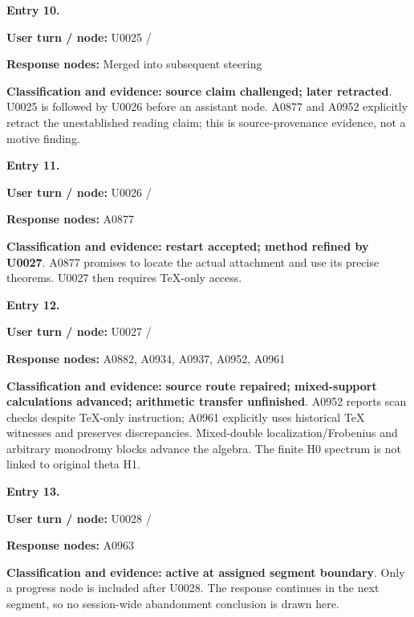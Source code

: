 
\textbf{Entry 10.}

\textbf{User turn / node:} U0025 /
\protect{}

\textbf{Response nodes:} Merged into subsequent steering

\textbf{Classification and evidence:} \textbf{source claim challenged;
later retracted}. U0025 is followed by U0026 before an assistant node.
A0877 and A0952 explicitly retract the unestablished reading claim; this
is source-provenance evidence, not a motive finding.


\textbf{Entry 11.}

\textbf{User turn / node:} U0026 /
\protect{}

\textbf{Response nodes:} A0877

\textbf{Classification and evidence:} \textbf{restart accepted; method
refined by U0027}. A0877 promises to locate the actual attachment and
use its precise theorems. U0027 then requires TeX-only access.


\textbf{Entry 12.}

\textbf{User turn / node:} U0027 /
\protect{}

\textbf{Response nodes:} A0882, A0934, A0937, A0952, A0961

\textbf{Classification and evidence:} \textbf{source route repaired;
mixed-support calculations advanced; arithmetic transfer unfinished}.
A0952 reports scan checks despite TeX-only instruction; A0961 explicitly
uses historical TeX witnesses and preserves discrepancies. Mixed-double
localization/Frobenius and arbitrary monodromy blocks advance the
algebra. The finite H0 spectrum is not linked to original theta H1.


\textbf{Entry 13.}

\textbf{User turn / node:} U0028 /
\protect{}

\textbf{Response nodes:} A0963

\textbf{Classification and evidence:} \textbf{active at assigned segment
boundary}. Only a progress node is included after U0028. The response
continues in the next segment, so no session-wide abandonment conclusion
is drawn here.

